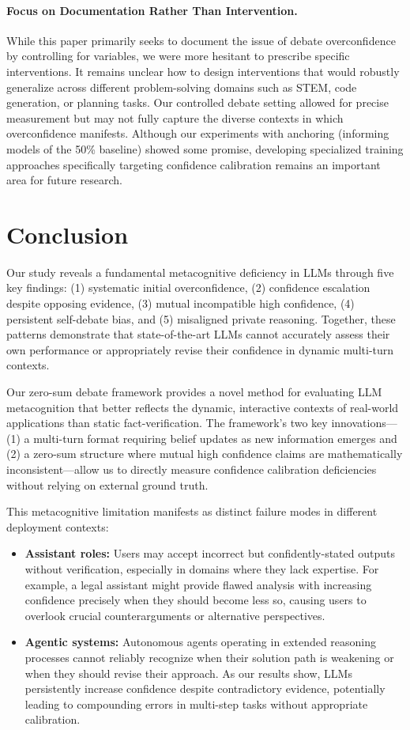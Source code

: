 \documentclass{article}
\begin{document}
\paragraph{Focus on Documentation Rather Than Intervention.} While this paper primarily seeks to document the issue of debate overconfidence by controlling for variables, we were more hesitant to prescribe specific interventions. It remains unclear how to design interventions that would robustly generalize across different problem-solving domains such as STEM, code generation, or planning tasks. Our controlled debate setting allowed for precise measurement but may not fully capture the diverse contexts in which overconfidence manifests. Although our experiments with anchoring (informing models of the 50\% baseline) showed some promise, developing specialized training approaches specifically targeting confidence calibration remains an important area for future research.

\section{Conclusion}

Our study reveals a fundamental metacognitive deficiency in LLMs through five key findings: (1) systematic initial overconfidence, (2) confidence escalation despite opposing evidence, (3) mutual incompatible high confidence, (4) persistent self-debate bias, and (5) misaligned private reasoning. Together, these patterns demonstrate that state-of-the-art LLMs cannot accurately assess their own performance or appropriately revise their confidence in dynamic multi-turn contexts.

Our zero-sum debate framework provides a novel method for evaluating LLM metacognition that better reflects the dynamic, interactive contexts of real-world applications than static fact-verification. The framework's two key innovations— (1) a multi-turn format requiring belief updates as new information emerges and (2) a zero-sum structure where mutual high confidence claims are mathematically inconsistent—allow us to directly measure confidence calibration deficiencies without relying on external ground truth.

This metacognitive limitation manifests as distinct failure modes in different deployment contexts:
\begin{itemize}
    \item \textbf{Assistant roles:} Users may accept incorrect but confidently-stated outputs without verification, especially in domains where they lack expertise. For example, a legal assistant might provide flawed analysis with increasing confidence precisely when they should become less so, causing users to overlook crucial counterarguments or alternative perspectives.
    \item \textbf{Agentic systems:} Autonomous agents operating in extended reasoning processes cannot reliably recognize when their solution path is weakening or when they should revise their approach. As our results show, LLMs persistently increase confidence despite contradictory evidence, potentially leading to compounding errors in multi-step tasks without appropriate calibration.
\end{itemize}
\end{document}
